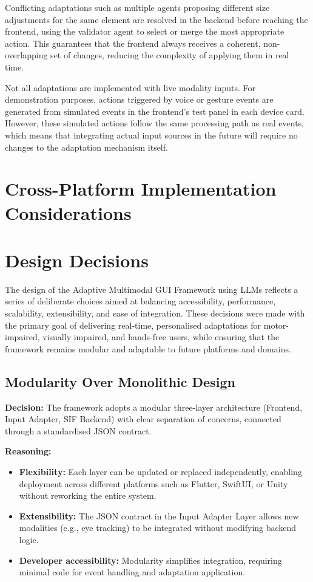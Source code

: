 \documentclass[openany]{book}
\begin{document}
Conflicting adaptations such as multiple agents proposing different size adjustments for the same element are resolved in the backend before reaching the frontend, using the validator agent to select or merge the most appropriate action. This guarantees that the frontend always receives a coherent, non-overlapping set of changes, reducing the complexity of applying them in real time.

Not all adaptations are implemented with live modality inputs. For demonstration purposes, actions triggered by voice or gesture events are generated from simulated events in the frontend’s test panel in each device card. However, these simulated actions follow the same processing path as real events, which means that integrating actual input sources in the future will require no changes to the adaptation mechanism itself.

\section{Cross-Platform Implementation Considerations}

\section{Design Decisions}
The design of the Adaptive Multimodal GUI Framework using LLMs reflects a series of deliberate choices aimed at balancing accessibility, performance, scalability, extensibility, and ease of integration. These decisions were made with the primary goal of delivering real-time, personalised adaptations for motor-impaired, visually impaired, and hands-free users, while ensuring that the framework remains modular and adaptable to future platforms and domains.

\subsection{Modularity Over Monolithic Design}
\textbf{Decision:} The framework adopts a modular three-layer architecture (Frontend, Input Adapter, SIF Backend) with clear separation of concerns, connected through a standardised JSON contract.

\textbf{Reasoning:}
\begin{itemize}
    \item \textbf{Flexibility:} Each layer can be updated or replaced independently, enabling deployment across different platforms such as Flutter, SwiftUI, or Unity without reworking the entire system.
    \item \textbf{Extensibility:} The JSON contract in the Input Adapter Layer allows new modalities (e.g., eye tracking) to be integrated without modifying backend logic.
    \item \textbf{Developer accessibility:} Modularity simplifies integration, requiring minimal code for event handling and adaptation application.
\end{itemize}
\end{document}
